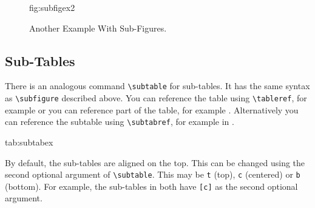 \documentclass[pmlr]{jmlr}%
\begin{document}
\begin{figure}[htbp]
\floatconts
  {fig:subfigex2}
  {\caption{Another Example With Sub-Figures.}}
  {%
    \qquad
  }
\end{figure}

\subsection{Sub-Tables}
\label{sec:subtables}
There is an analogous command \verb|\subtable| for sub-tables.
It has the same syntax as \verb|\subfigure| described above.
You can reference the table using \verb|\tableref|, for example
 or you can reference part of the table,
for example . Alternatively you can reference the
subtable using \verb|\subtabref|, for example
 in .

\begin{table}[htbp]
\floatconts
 {tab:subtabex}
 {\caption{An Example With Sub-Tables}}
 {%
   \qquad
 }
\end{table}

By default, the sub-tables are aligned on the top.
This can be changed using the second optional argument
of \verb|\subtable|. This may be \texttt{t} (top), \texttt{c}
(centered) or \texttt{b} (bottom). For example, the sub-tables
 in 
both have \verb|[c]| as the second optional argument.
\end{document}
